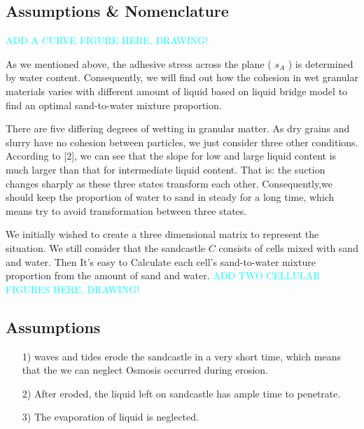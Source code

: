 \documentclass[12pt]{article}
\begin{document}
\subsection{Assumptions \& Nomenclature}
\textcolor{cyan}{ADD A CURVE FIGURE HERE, DRAWING!}
\par
As we mentioned above, the adhesive stress across the plane ( $s_A$ ) is determined by water content. Consequently, we will find out how the cohesion in wet granular materials varies with different amount of liquid based on liquid bridge model to find an optimal sand-to-water mixture proportion.
\par
There are five differing degrees of wetting in granular matter. As dry grains and slurry have no cohesion between particles, we just consider three other conditions. According to [2], we can see that the slope for low and large liquid content is much larger than that for intermediate liquid content. That is: the suction changes sharply as these three states transform each other. Consequently,we should keep the proportion of water to sand in steady for a long time, which means try to avoid transformation between three states.
\par
We initially wished to create a three dimensional matrix to represent the situation. We still consider that the sandcastle $C$ consists of cells mixed with sand and water. Then It's easy to Calculate each cell’s sand-to-water mixture proportion from the amount of sand and water.
\textcolor{cyan}{ADD TWO CELLULAR FIGURES HERE, DRAWING!}
\subsection{Assumptions}
\begin{itemize}
    \item [1)]
          waves and tides erode the sandcastle in a very short time, which means that the we can neglect Osmosis occurred during erosion.
    \item [2)]
          After eroded, the liquid left on sandcastle has ample time to penetrate.
    \item [3)]
          The evaporation of liquid is neglected.
\end{itemize}
\end{document}
